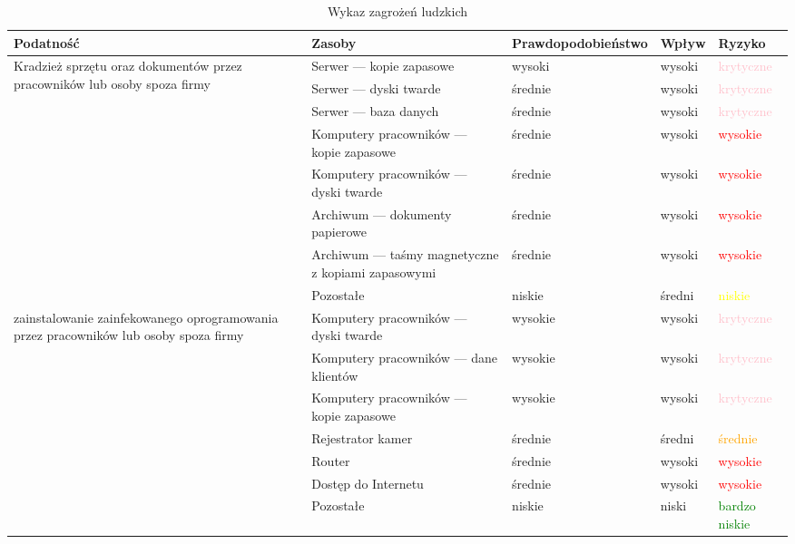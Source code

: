 \begin{landscape}
\begin{longtable}[!ht]{|m{4cm}|m{6cm}|m{4.5cm}|m{3cm}|m{3cm}|}
	\caption{Wykaz zagrożeń ludzkich}
	\label{tab::zagrozenia_ludzkie} \\
		\hline
		\textbf{Podatność} & \textbf{Zasoby} & \textbf{Prawdopodobieństwo} & \textbf{Wpływ} &  \textbf{Ryzyko} \\ \hline
		\multirow{8}{4cm}{Kradzież sprzętu oraz dokumentów przez pracowników lub osoby spoza firmy}            
			& Serwer --- kopie zapasowe & wysoki & wysoki & \textcolor{pink}{krytyczne} \\ \cline{2-5} 
			& Serwer --- dyski twarde & średnie & wysoki & \textcolor{pink}{krytyczne} \\ \cline{2-5} 
			& Serwer --- baza danych & średnie & wysoki & \textcolor{pink}{krytyczne} \\ \cline{2-5} 
			& Komputery pracowników --- kopie zapasowe & średnie & wysoki & \textcolor{red}{wysokie} \\ \cline{2-5} 
			& Komputery pracowników --- dyski twarde & średnie & wysoki & \textcolor{red}{wysokie} \\ \cline{2-5} 
			& Archiwum --- dokumenty papierowe & średnie & wysoki & \textcolor{red}{wysokie} \\ \cline{2-5} 
			& Archiwum --- taśmy magnetyczne z kopiami zapasowymi  & średnie  & wysoki & \textcolor{red}{wysokie} \\ \cline{2-5} 
			& Pozostałe & niskie  & średni & \textcolor{yellow}{niskie} \\ \hline
		\multirow{7}{4cm}{zainstalowanie zainfekowanego oprogramowania przez pracowników lub osoby spoza firmy} 
			& Komputery pracowników --- dyski twarde & wysokie & wysoki & \textcolor{pink}{krytyczne} \\ \cline{2-5} 
			& Komputery pracowników --- dane klientów & wysokie & wysoki & \textcolor{pink}{krytyczne} \\ \cline{2-5} 
			& Komputery pracowników --- kopie zapasowe & wysokie & wysoki & \textcolor{pink}{krytyczne} \\ \cline{2-5} 
			& Rejestrator kamer & średnie & średni & \textcolor{orange}{średnie} \\ \cline{2-5} 
			& Router & średnie & wysoki & \textcolor{red}{wysokie} \\ \cline{2-5} 
			& Dostęp do Internetu & średnie  & wysoki & \textcolor{red}{wysokie} \\ \cline{2-5} 
			& Pozostałe  & niskie & niski  & \textcolor{green}{bardzo niskie} \\ \hline

\end{longtable}
\end{landscape}
